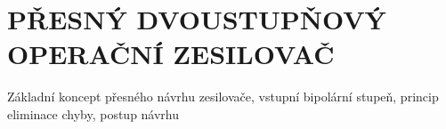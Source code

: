 \section{PŘESNÝ DVOUSTUPŇOVÝ OPERAČNÍ ZESILOVAČ}
Základní koncept přesného návrhu zesilovače, vstupní bipolární stupeň, princip eliminace chyby, postup návrhu
